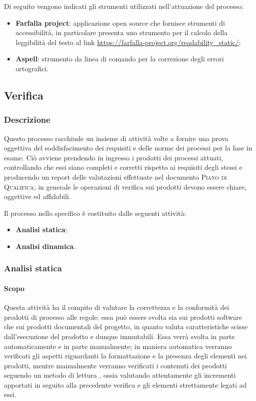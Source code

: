 Di seguito vengono indicati gli strumenti utilizzati nell'attuazione del processo:
\begin{itemize}
	\item \textbf{Farfalla project}: applicazione open source che fornisce strumenti di accessibilità, in particolare presenta uno
		strumento per il calcolo della leggibilità del testo al link \url{https://farfalla-project.org/readability_static/};
	\item \textbf{Aspell}: strumento da linea di comando per la correzione degli errori ortografici.
\end{itemize}

\subsection{Verifica}
\label{sub:verifica}

\subsubsection{Descrizione}
Questo processo racchiude un insieme di attività volte a fornire una prova oggettiva del soddisfacimento dei requisiti e delle norme dei
processi per la fase in esame. Ciò avviene prendendo in ingresso i prodotti dei processi attuati, controllando che essi siano completi e corretti
rispetto ai requisiti degli stessi e producendo un report delle valutazioni effettuate nel documento \textsc{Piano di Qualifica}; in
generale le operazioni di verifica sui prodotti devono essere chiare, oggettive ed affidabili.

Il processo nello specifico è costituito dalle seguenti attività:
\begin{itemize}
	\item \textbf{Analisi statica};
	\item \textbf{Analisi dinamica}.
\end{itemize}

\subsubsection{Analisi statica}
\label{ssub:verifica:analisi_statica}

\paragraph{Scopo}
Questa attività ha il compito di valutare la correttezza e la conformità dei prodotti di processo alle regole; essa può essere svolta sia
sui prodotti software che sui prodotti documentali del progetto, in quanto valuta caratteristiche scisse dall'esecuzione del prodotto e
dunque immutabili. Essa verrà svolta in parte automaticamente e in parte manualmente; in maniera automatica verranno verificati gli
aspetti riguardanti la formattazione e la presenza degli elementi nei prodotti, mentre manualmente verranno verificati i contenuti dei
prodotti seguendo un metodo di lettura , ossia valutando attentamente gli incrementi apportati in seguito alla
precedente verifica e gli elementi strettamente legati ad essi.

